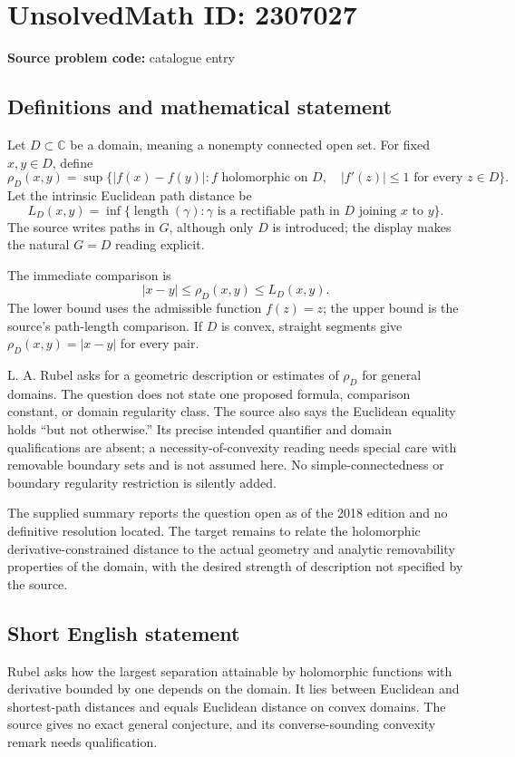 \documentclass[11pt]{article}
\newcommand{\C}{\mathbb{C}}
\begin{document}
\section*{UnsolvedMath ID: 2307027}
\textbf{Source problem code:} catalogue entry
\subsection{Definitions and mathematical statement}
Let $D\subset\C$ be a domain, meaning a nonempty connected open set. For fixed $x,y\in D$, define
\[
\rho_D(x,y)=\sup\{|f(x)-f(y)|:
 f\text{ holomorphic on }D,\quad |f'(z)|\leq1\text{ for every }z\in D\}.
\]
Let the intrinsic Euclidean path distance be
\[
L_D(x,y)=\inf\{\operatorname{length}(\gamma):
\gamma\text{ is a rectifiable path in }D\text{ joining }x\text{ to }y\}.
\]
The source writes paths in $G$, although only $D$ is introduced; the display makes the natural $G=D$ reading explicit.

The immediate comparison is
\[
|x-y|\leq\rho_D(x,y)\leq L_D(x,y).
\]
The lower bound uses the admissible function $f(z)=z$; the upper bound is the source's path-length comparison. If $D$ is convex, straight segments give $\rho_D(x,y)=|x-y|$ for every pair.

L. A. Rubel asks for a geometric description or estimates of $\rho_D$ for general domains. The question does not state one proposed formula, comparison constant, or domain regularity class. The source also says the Euclidean equality holds ``but not otherwise.'' Its precise intended quantifier and domain qualifications are absent; a necessity-of-convexity reading needs special care with removable boundary sets and is not assumed here. No simple-connectedness or boundary regularity restriction is silently added.

The supplied summary reports the question open as of the 2018 edition and no definitive resolution located. The target remains to relate the holomorphic derivative-constrained distance to the actual geometry and analytic removability properties of the domain, with the desired strength of description not specified by the source.
\subsection{Short English statement}
Rubel asks how the largest separation attainable by holomorphic functions with derivative bounded by one depends on the domain. It lies between Euclidean and shortest-path distances and equals Euclidean distance on convex domains. The source gives no exact general conjecture, and its converse-sounding convexity remark needs qualification.
\end{document}
